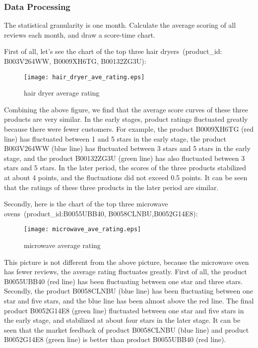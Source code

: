 \documentclass{mcmthesis}
\begin{document}
	\subsubsection{Data Processing}
	
	The statistical granularity is one month. Calculate the average scoring of all reviews each month, and draw a score-time chart.
	
	First of all, let's see the chart of the top three hair dryers\ (product\_id: B003V264WW, B0009XH6TG, B00132ZG3U):
	
	\begin{figure}[H]
		\small
		\centering
		\texttt{[image: hair\_dryer\_ave\_rating.eps]}
		\caption{hair dryer average rating} \label{fig:hair dryer average rating}
	\end{figure}
	
	Combining the above figure, we find that the average score curves of these three products are very similar. In the early stages, product ratings fluctuated greatly because there were fewer customers. For example, the product B0009XH6TG (red line) has fluctuated between 1 and 5 stars in the early stage, the product B003V264WW (blue line) has fluctuated between 3 stars and 5 stars in the early stage, and the product B00132ZG3U (green line) has also fluctuated between 3 stars and 5 stars. In the later period, the scores of the three products stabilized at about 4 points, and the fluctuations did not exceed 0.5 points. It can be seen that the ratings of these three products in the later period are similar.
	
	Secondly, here is the chart of the top three microwave ovens\    (product\_id:B0055UBB40, B0058CLNBU,B0052G14E8):
	
	\begin{figure}[H]
		\small
		\centering
		\texttt{[image: microwave\_ave\_rating.eps]}
		\caption{microwave average rating} \label{fig:micorwave average rating}
	\end{figure}
	
	This picture is not different from the above picture, because the microwave oven has fewer reviews, the average rating fluctuates greatly. First of all, the product B0055UBB40 (red line) has been fluctuating between one star and three stars. Secondly, the product B0058CLNBU (blue line) has been fluctuating between one star and five stars, and the blue line has been almost above the red line. The final product B0052G14E8 (green line) fluctuated between one star and five stars in the early stage, and stabilized at about four stars in the later stage. It can be seen that the market feedback of product B0058CLNBU (blue line) and product B0052G14E8 (green line) is better than product B0055UBB40 (red line).
	
\end{document}
